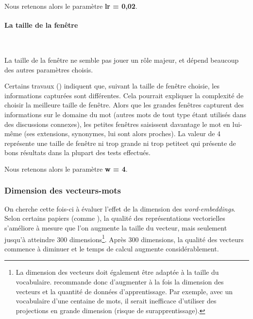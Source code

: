 \documentclass[11pt,french,french]{article}
\let\rmarkdownfootnote\footnote%
\def\footnote{\protect\rmarkdownfootnote}
\begin{document}
\faArrowCircleRight{} Nous retenons alors le paramètre \textbf{lr =
0,02}.

\paragraph{La taille de la fenêtre}\label{la-taille-de-la-fenuxeatre}

~

La taille de la fenêtre ne semble pas jouer un rôle majeur, et dépend
beaucoup des autres paramètres choisis.

Certains travaux (\cite{Levy2}) indiquent que, suivant la taille de
fenêtre choisie, les informations capturées sont différentes. Cela
pourrait expliquer la complexité de choisir la \og meilleure \fg taille
de fenêtre. Alors que les \og grandes \fg fenêtres capturent des
informations sur le domaine du mot (autres mots de tout type étant
utilisés dans des discussions connexes), les \og petites \fg fenêtres
saisissent davantage le mot en lui-même (ses extensions, synonymes, lui
sont alors proches). La valeur de 4 représente une taille de fenêtre
\og ni trop grande ni trop petite\fg et qui présente de bons résultats
dans la plupart des tests effectués.

\faArrowCircleRight{} Nous retenons alors le paramètre \textbf{w = 4}.

\subsubsection{Dimension des
vecteurs-mots}\label{dimension-des-vecteurs-mots}

On cherche cette fois-ci à évaluer l'effet de la dimension des
\emph{word-embeddings}. Selon certains papiers (comme
\cite{Pennington}), la qualité des représentations vectorielles
s'améliore à mesure que l'on augmente la taille du vecteur, mais
seulement jusqu'à atteindre 300 dimensions\footnote{La dimension des
  vecteurs doit également être adaptée à la taille du vocabulaire.
  \cite{Mikolov} recommande donc d'augmenter à la fois la dimension des
  vecteurs et la quantité de données d'apprentissage. Par exemple, avec
  un vocabulaire d'une centaine de mots, il serait inefficace d'utiliser
  des projections en grande dimension (risque de surapprentissage).}.
Après 300 dimensions, la qualité des vecteurs commence à diminuer et le
temps de calcul augmente considérablement.
\end{document}
